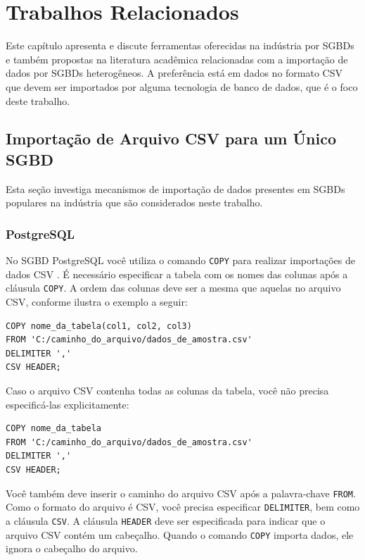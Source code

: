 \chapter{Trabalhos Relacionados}

Este capítulo apresenta e discute ferramentas oferecidas na indústria por SGBDs e também
propostas na literatura acadêmica relacionadas com a importação de dados por SGBDs
heterogêneos. A preferência está em dados no formato CSV que devem ser importados por
alguma tecnologia de banco de dados, que é o foco deste trabalho.

\section{Importação de Arquivo CSV para um Único SGBD}

Esta seção investiga mecanismos de importação de dados presentes em SGBDs populares na
indústria que são considerados neste trabalho.

\subsection{PostgreSQL}

No SGBD PostgreSQL você utiliza o comando \texttt{COPY} para realizar importações de dados
CSV \cite{postgresql_copy}. É necessário especificar a tabela com os nomes das colunas após a cláusula
\texttt{COPY}. A ordem das colunas deve ser a mesma que aquelas no arquivo CSV, conforme
ilustra o exemplo a seguir:

\begin{lstlisting}[style=sqlstyle]
COPY nome_da_tabela(col1, col2, col3)
FROM 'C:/caminho_do_arquivo/dados_de_amostra.csv'
DELIMITER ','
CSV HEADER;
\end{lstlisting}

Caso o arquivo CSV contenha todas as colunas da tabela, você não precisa especificá-las
explicitamente:

\begin{lstlisting}[style=sqlstyle]
COPY nome_da_tabela
FROM 'C:/caminho_do_arquivo/dados_de_amostra.csv'
DELIMITER ','
CSV HEADER;
\end{lstlisting}

Você também deve inserir o caminho do arquivo CSV após a palavra-chave \texttt{FROM}. Como
o formato do arquivo é CSV, você precisa especificar \texttt{DELIMITER}, bem como a
cláusula \texttt{CSV}. A cláusula \texttt{HEADER} deve ser especificada para indicar que o
arquivo CSV contém um cabeçalho. Quando o comando \texttt{COPY} importa dados, ele ignora
o cabeçalho do arquivo.

